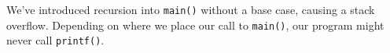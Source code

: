 %
We've introduced recursion into \texttt{main()} without a base
case, causing a stack overflow.  Depending on where we place our call to
\texttt{main()}, our program might never call
\texttt{printf()}.
